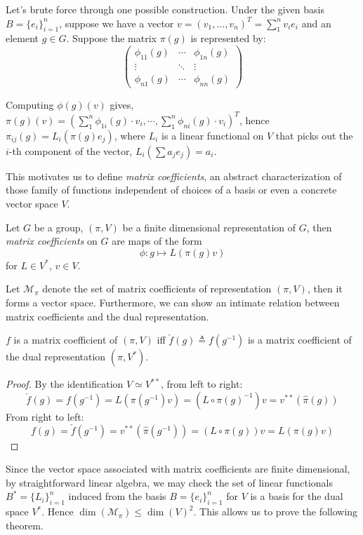 Let's brute force through one possible construction. Under the given basis $B =
\{e_i\}_{i = 1}^{n}$, suppose we have a vector $v = (v_1, \ldots, v_n)^{T} =
\sum_1^n v_i e_i$ and an element $g \in G$. Suppose the matrix $\pi(g)$ is
represented by:
\[
  \begin{pmatrix}
    \phi_{11}(g) & \cdots & \phi_{1n}(g)\\
    \vdots & \ddots & \vdots\\
    \phi_{n1}(g) & \cdots & \phi_{nn}(g)
  \end{pmatrix}
\]

Computing $\phi(g)(v)$ gives, $\pi(g)(v) = (\sum_{1}^{n} \phi_{1i}(g) \cdot v_i,
\cdots, \sum_{1}^{n} \phi_{ni}(g) \cdot v_i)^{T}$, hence $\pi_{ij}(g) =
L_i(\pi(g)e_j)$, where $L_i$ is a linear functional on $V$ that picks out the
$i$-th component of the vector, $L_i(\sum a_j e_j) = a_i$.

This motivates us to define \emph{matrix coefficients}, an
abstract characterization of those family of functions independent of choices of
a basis or even a concrete vector space $V$.

\begin{defn}
  Let $G$ be a group, $(\pi, V)$ be a finite dimensional representation of $G$,
  then \emph{matrix coefficients} on $G$ are maps of the form
  \[
    \phi : g \mapsto L(\pi(g)v)
  \]
  for $L \in V^*$, $v \in V$.
\end{defn}

Let $\mathcal{M}_{\pi}$ denote the set of matrix coefficients of representation
$(\pi,V)$, then it forms a vector space. Furthermore, we can show an intimate
relation between matrix coefficients and the dual representation.

\begin{prop} \label{dual-mat-coeff}
  $f$ is a matrix coefficient of $(\pi,V)$ iff $\check{f}(g) \triangleq
  f(g^{-1})$ is a matrix coefficient of the dual representation $(\hat{\pi},V^*)$.
\end{prop}

\begin{proof}
  By the identification $V \simeq V^{**}$, from left to right:
  \[
    \check{f}(g) = f(g^{-1}) = L(\pi(g^{-1})v) = (L \circ \pi(g)^{-1}) v = v^{**}(\hat{\pi}(g))
  \]
  From right to left:
  \[
    f(g) = \check{f}(g^{-1}) = v^{**}(\hat{\pi}(g^{-1})) = (L \circ \pi(g)) v = L(\pi(g)v)
  \]
\end{proof}

Since the vector space associated with matrix coefficients are
finite dimensional, by straightforward linear algebra, we may check the set of
linear functionals $B^* = \{L_i\}_{i = 1}^{n}$ induced from the basis $B =
\{e_i\}_{i = 1}^{n}$ for $V$ is a basis for the dual space $V^*$.  Hence
$\dim(\mathcal{M}_{\pi}) \leq \dim(V)^2$. This allows us to prove the following
theorem.


